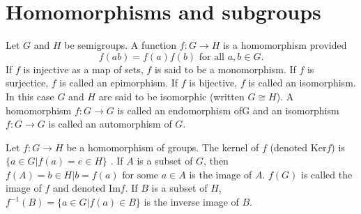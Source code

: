 \section{Homomorphisms and subgroups}
\begin{definition}
    Let $G$ and $H$ be semigroups. A function $f : G \to H$ is a homomorphism provided
    \[f(ab) = f(a)f(b) \text{ for all } a,b \in G.\]
    If $f$ is injective as a map of sets, $f$ is said to be a monomorphism. If $f$ is surjectice, $f$ is called an epimorphism. If $f$ is bijective, $f$ is called an isomorphism. In this case $G$ and $H$ are said to be isomorphic (written $G \cong H$). A homomorphism $f : G \to G$ is called an endomorphism ofG and an isomorphism $f : G \to G$ is called an automorphism of $G$.
\end{definition}

\begin{definition}
    Let $f : G \to H$ be a homomorphism of groups. The kernel of $f$ (denoted $\mathrm{Ker}f$) is $\{ a \in G | f(a) = e \in H\}$ . If $A$ is a subset of $G$, then $f(A) = { b \in H | b = f(a) \text{ for some } a \in A}$ is the image of $A$. $f(G)$ is called the image of $f$ and denoted $\mathrm{Im} f$. If $B$ is a subset of $H$, $f^{-1}(B) =\{ a \in G | f(a) \in B \}$ is the inverse image of $B$.
\end{definition}